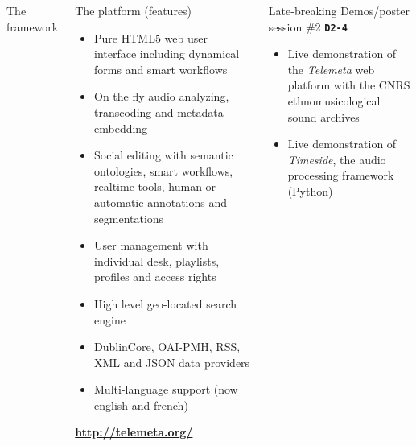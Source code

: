 \documentclass[final, hyperref, table]{beamer} \mode<presentation>
\begin{document}
\begin{frame}
\begin{columns}
\begin{block}{The framework}
    \end{block}


    \column[t]{6cm}
    \begin{block}{The platform (features)}
      \begin{itemize}
        \setlength{\itemsep}{1.5pt}
      \item \alert{Pure HTML5} web user interface including dynamical forms
        and smart workflows
      \item \alert{On the fly} audio analyzing, transcoding and \alert{metadata}
        embedding
      \item Social editing with \alert{semantic ontologies}, smart workflows,
        realtime tools, human or automatic \alert{annotations and
        segmentations}
      \item User management with individual desk, playlists, profiles
        and access rights
      \item High level geo-located search engine
      \item DublinCore, OAI-PMH, RSS, XML and JSON \alert{data providers}
      \item Multi-language support (now english and french)
      \end{itemize}
      \vspace{-0.6cm}
      \begin{center}
        \colorbox{yellow!50}{\textbf{\url{http://telemeta.org/}}}
      \end{center}
    \end{block}
    \vspace{-0.2cm}
    \begin{block}{Late-breaking Demos/poster session \#2
        \texttt{\textbf{D2-4}}}
      \begin{itemize}
      \item Live demonstration of the \emph{Telemeta} web platform
        with the CNRS \alert{ethnomusicological sound archives}
      \item Live demonstration of \emph{Timeside}, the audio
        processing framework (Python)
      \end{itemize}
    \end{block}

  \end{columns}
\end{frame}
\end{document}
